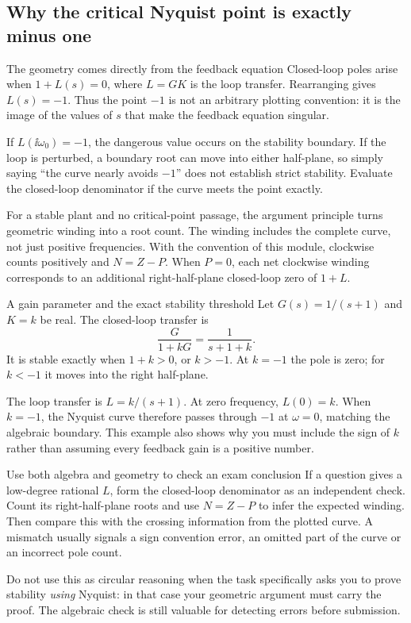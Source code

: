 \subsection{Why the critical Nyquist point is exactly minus one}
\begin{concept}{The geometry comes directly from the feedback equation}
Closed-loop poles arise when $1+L(s)=0$, where $L=GK$ is the loop transfer. Rearranging gives $L(s)=-1$. Thus the point $-1$ is not an arbitrary plotting convention: it is the image of the values of $s$ that make the feedback equation singular.

If $L(\ii\omega_0)=-1$, the dangerous value occurs on the stability boundary. If the loop is perturbed, a boundary root can move into either half-plane, so simply saying ``the curve nearly avoids $-1$'' does not establish strict stability. Evaluate the closed-loop denominator if the curve meets the point exactly.

For a stable plant and no critical-point passage, the argument principle turns geometric winding into a root count. The winding includes the complete curve, not just positive frequencies. With the convention of this module, clockwise counts positively and $N=Z-P$. When $P=0$, each net clockwise winding corresponds to an additional right-half-plane closed-loop zero of $1+L$.
\end{concept}
\begin{worked}{A gain parameter and the exact stability threshold}
Let $G(s)=1/(s+1)$ and $K=k$ be real. The closed-loop transfer is
\[\frac G{1+kG}=\frac1{s+1+k}.\]
It is stable exactly when $1+k>0$, or $k>-1$. At $k=-1$ the pole is zero; for $k<-1$ it moves into the right half-plane.

The loop transfer is $L=k/(s+1)$. At zero frequency, $L(0)=k$. When $k=-1$, the Nyquist curve therefore passes through $-1$ at $\omega=0$, matching the algebraic boundary. This example also shows why you must include the sign of $k$ rather than assuming every feedback gain is a positive number.
\end{worked}
\begin{method}{Use both algebra and geometry to check an exam conclusion}
If a question gives a low-degree rational $L$, form the closed-loop denominator as an independent check. Count its right-half-plane roots and use $N=Z-P$ to infer the expected winding. Then compare this with the crossing information from the plotted curve. A mismatch usually signals a sign convention error, an omitted part of the curve or an incorrect pole count.

Do not use this as circular reasoning when the task specifically asks you to prove stability \emph{using} Nyquist: in that case your geometric argument must carry the proof. The algebraic check is still valuable for detecting errors before submission.
\end{method}
